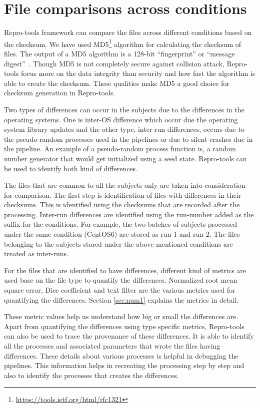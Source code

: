 \section{File comparisons across conditions}\label{file_analysis}
Repro-tools framework can compare the files across different conditions based on the checksum. We have used MD5\footnote{\url{https://tools.ietf.org/html/rfc1321}} algorithm for calculating the checksum of files. The output of a MD5 algorithm is a 128-bit ``fingerprint'' or ``message digest''~\cite{md5}. Though MD5 is not completely secure against collision attack, Repro-tools focus more on the data integrity than security and how fast the algorithm is able to create the checksum. These qualities make MD5 a good choice for checksum generation in Repro-tools.

Two types of differences can occur in the subjects due to the differences in the operating systems. One is inter-OS difference which occur due the operating system library updates and the other type, inter-run differences, occurs due to the pseudo-random processes used in the pipelines or due to silent crashes due in the pipeline. An example of a pseudo-random process function is, a random number generator that would get initialized using a seed state. Repro-tools can be used to identify both kind of differences.

The files that are common to all the subjects only are taken into consideration for comparison. The first step is identification of files with differences in their checksums. This is identified using the checksums that are recorded after the processing. Inter-run differences are identified using the run-number added as the suffix for the conditions. For example, the two batches of subjects processed under the same condition (CentOS6) are stored as run-1 and run-2. The files belonging to the subjects stored under the above mentioned conditions are treated as inter-runs.

For the files that are identified to have differences, different kind 
of metrics are used base on the file type to quantify the differences. 
Normalized root mean square error, Dice coefficient and text filter are 
the various metrics used for quantifying the differences. Section 
\ref{sec:num1} explains the metrics in detail.

These metric values help us understand how big or small the differences 
are. Apart from quantifying the differences using type specific 
metrics, Repro-tools can also be used to trace the provenance of these 
differences. It is able to identify all the processes and associated 
parameters that wrote the files having differences. These details about 
various processes is helpful in debugging the pipelines. This 
information helps in recreating the processing step by step and also to 
identify the processes that creates the differences.

